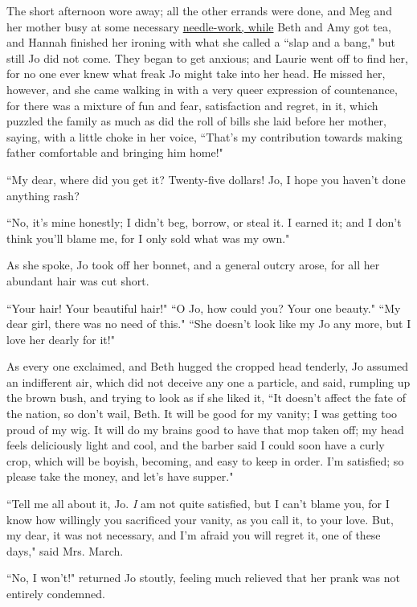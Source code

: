 The short afternoon wore away; all the other errands were done, and Meg
and her mother busy at some necessary \underline{needle-work, while} Beth and
Amy got tea, and Hannah finished her ironing with what she called a
``slap and a bang," but still Jo did not come. They began to get anxious;
and Laurie went off to find her, for no one ever knew what freak Jo
might take into her head. He missed her, however, and she came walking
in with a very queer expression of countenance, for there was a mixture
of fun and fear, satisfaction and regret, in it, which puzzled the
family as much as did the roll of bills she laid before her mother,
saying, with a little choke in her voice, ``That's my
contribution towards making father comfortable and bringing him home!"

``My dear, where did you get it? Twenty-five dollars! Jo, I hope you
haven't done anything rash?

``No, it's mine honestly; I didn't beg,
borrow, or steal it. I earned it; and I don't think
you'll blame me, for I only sold what was my own."

As she spoke, Jo took off her bonnet, and a general outcry arose, for
all her abundant hair was cut short.

``Your hair! Your beautiful hair!" ``O Jo, how could you? Your one
beauty." ``My dear girl, there was no need of this." ``She
doesn't look like my Jo any more, but I love her dearly
for it!"

As every one exclaimed, and Beth hugged the cropped head tenderly, Jo
assumed an indifferent air, which did not deceive any one a particle,
and said, rumpling up the brown bush, and trying to look as if she liked
it, ``It doesn't affect the fate of the nation, so
don't wail, Beth. It will be good for my vanity; I was
getting too proud of my wig. It will do my brains good to have that mop
taken off; my head feels deliciously light and cool, and the barber said
I could soon have a curly crop, which will be boyish, becoming, and easy
to keep in order. I'm satisfied; so please take the
money, and let's have supper."

``Tell me all about it, Jo. \emph{I} am not quite satisfied, but I
can't blame you, for I know how willingly you sacrificed
your vanity, as you call it, to your love. But, my dear, it was not
necessary, and I'm afraid you will regret it, one of
these days," said Mrs. March.

``No, I won't!" returned Jo stoutly, feeling much
relieved that her prank was not entirely condemned.

